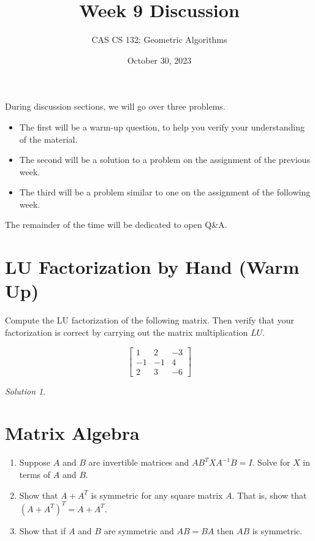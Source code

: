 \documentclass{article}
\title{
  Week 9 Discussion
}
\author{CAS CS 132: Geometric Algorithms}
\date{October 30, 2023}
\theoremstyle{remark}
\newtheorem*{solution}{Solution}
\begin{document}
\maketitle

\noindent During discussion sections, we will go over three problems.
\begin{itemize}
\item The first will be a warm-up question, to help you verify your understanding of the material.
\item The second will be a solution to a problem on the assignment of the previous week.
\item The third will be a problem similar to one on the assignment of the following week.
\end{itemize}
The remainder of the time will be dedicated to open Q\&A.

\pagebreak
\section{LU Factorization by Hand (Warm Up)}

Compute the LU factorization of the following matrix.
Then verify that your factorization is correct by carrying out the matrix multiplication $LU$.

\begin{displaymath}
  \begin{bmatrix}
    1 & 2 & -3 \\
    -1 & -1 & 4 \\
    2 & 3 & -6
  \end{bmatrix}
\end{displaymath}

\medskip

\begin{solution}
\end{solution}

\pagebreak
\section{Matrix Algebra}

\begin{enumerate}
\item Suppose $A$ and $B$ are invertible matrices and $AB^TXA^{-1}B = I$. Solve for $X$ in terms of $A$ and $B$.
\item Show that $A + A^T$ is symmetric for any square matrix $A$. That is, show that $(A + A^T)^T = A + A^T$.
\item Show that if $A$ and $B$ are symmetric and $AB = BA$ then $AB$ is symmetric.
\end{enumerate}
\end{document}

